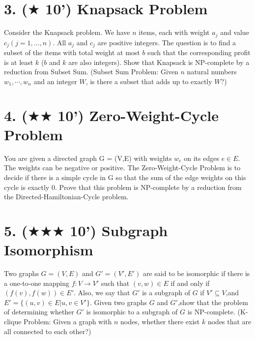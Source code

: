 \documentclass{article}
\begin{document}
\newpage
\section*{3. ($\bigstar$ 10') Knapsack Problem}

Consider the Knapsack problem. We have $n$ items, each with weight $a_j$ and value $c_j (j = 1,..., n)$. All
$a_j$ and $c_j$ are positive integers. The question is to find a subset of the items with total weight at most $b$ such
that the corresponding profit is at least $k$ ($b$ and $k$ are also integers). Show that Knapsack is NP-complete
by a reduction from Subset Sum. (Subset Sum Problem: Given $n$ natural numbers $w_1,\cdots, w_n$ and an integer $W$, is there a
subset that adds up to exactly $W$?)

\pagebreak
\section*{4. ($\bigstar\bigstar$ 10') Zero-Weight-Cycle Problem}

You are given a directed graph G = (V,E) with weights $w_e$ on its edges $e \in E$. The weights can be negative or positive. The Zero-Weight-Cycle Problem is to decide if there is a simple cycle in G so that the sum of the edge weights on this cycle is exactly 0. Prove that this problem is NP-complete by a reduction from the Directed-Hamiltonian-Cycle problem.

\pagebreak
\section*{5. ($\bigstar\bigstar\bigstar$ 10') Subgraph Isomorphism}

Two graphs $G = (V, E)$ and $G' = (V', E')$ are said to be isomorphic if there is a one-to-one mapping $f:V \rightarrow V'$ such that $(v,w)\in E$ if and only if $(f(v),f(w))\in E'$. Also, we say that $G'$ is a subgraph of $G$ if $V' \subseteq V$,and $E' =\{(u,v)\in E | u,v \in V'\}$. Given two graphs $G$ and $G'$,show that the problem of determining whether $G'$ is isomorphic to a subgraph of $G$ is NP-complete. (K-clique Problem: Given a graph with $n$ nodes, whether there exist $k$ nodes that are all connected to each other?)
\end{document}
